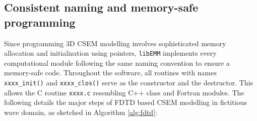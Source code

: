 \documentclass[a4paper,10pt]{article}
\begin{document}
\subsection{Consistent naming and memory-safe programming}

Since programming 3D CSEM modelling involves sophisticated memory allocation and initialization using pointers, \verb|libEMM| implements every computational module following the same naming convention to ensure a memory-safe code. Throughout the software, all routines with names \verb|xxxx_init()| and \verb|xxxx_clos()| serve as the constructor and the destructor. This allows the C routine \verb|xxxx.c| resembling C++ class and Fortran modules. The following details the major steps of FDTD based CSEM modelling in fictitious wave domain, as sketched in Algorithm \ref{alg:fdtd}:
\end{document}
